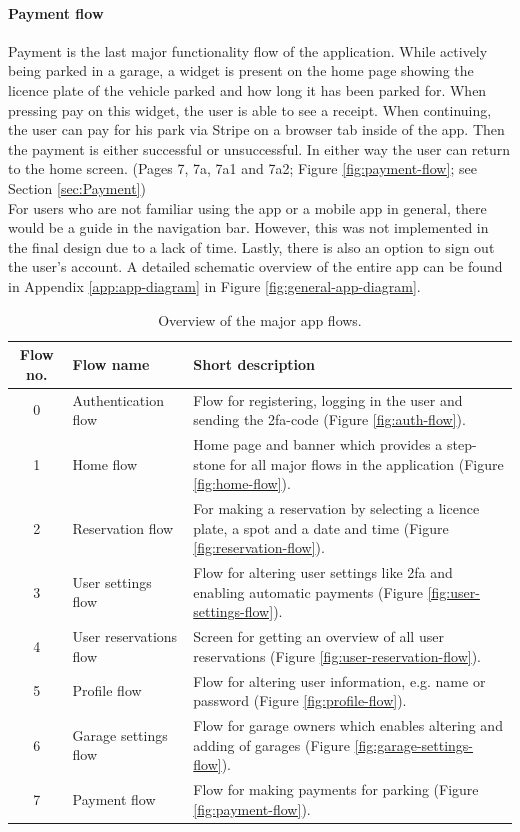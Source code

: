 \paragraph{Payment flow}
Payment is the last major functionality flow of the application. While actively being parked in a garage, a widget is present on the home page showing the licence plate of the vehicle parked and how long it has been parked for. When pressing pay on this widget, the user is able to see a receipt. When continuing, the user can pay for his park via Stripe on a browser tab inside of the app. Then the payment is either successful or unsuccessful. 
 In either way the user can return to the home screen. (Pages 7, 7a, 7a1 and 7a2; Figure \ref{fig:payment-flow}; see Section \ref{sec:Payment}) \\

For users who are not familiar using the app or a mobile app in general, there would be a guide in the navigation bar. However, this was not implemented in the final design due to a lack of time. Lastly, there is also an option to sign out the user's account. A detailed schematic overview of the entire app can be found in Appendix \ref{app:app-diagram} in Figure \ref{fig:general-app-diagram}.

\begin{table}[htp]
    \centering
    \begin{tabular}{|c|p{3cm}|p{10cm}|}
    \hline
         \textbf{Flow no.} & \textbf{Flow name} & \textbf{Short description} \\
         \hline
         \hline
         0 & Authentication flow & Flow for registering, logging in the user and sending the \ac{2fa}-code (Figure \ref{fig:auth-flow}). \\
         \hline
         1 & Home flow & Home page and banner which provides a step-stone for all major flows in the application (Figure \ref{fig:home-flow}).\\
         \hline 
         2 & Reservation flow & For making a reservation by selecting a licence plate, a spot and a date and time (Figure \ref{fig:reservation-flow}). \\
         \hline 
         3 & User settings flow & Flow for altering user settings like \ac{2fa} and enabling automatic payments (Figure \ref{fig:user-settings-flow}). \\
         \hline
         4 & User reservations flow & Screen for getting an overview of all user reservations (Figure \ref{fig:user-reservation-flow}). \\ 
         \hline
         5 & Profile flow & Flow for altering user information, e.g. name or password (Figure \ref{fig:profile-flow}). \\
         \hline 
         6 & Garage settings flow & Flow for garage owners which enables altering and adding of garages (Figure \ref{fig:garage-settings-flow}). \\ 
         \hline
         7 & Payment flow & Flow for making payments for parking (Figure \ref{fig:payment-flow}). \\
         \hline
    \end{tabular}
    \caption{Overview of the major app flows.}
    \label{tab:app-flows}
\end{table}

